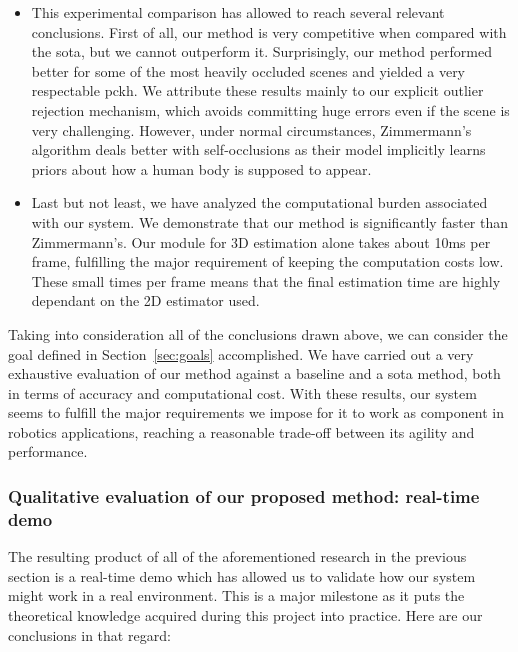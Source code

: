 \begin{itemize}
    \item This experimental comparison has allowed to reach several relevant conclusions. First of all, our method is very competitive when compared with the \gls{sota}, but we cannot outperform it. Surprisingly, our method performed better for some of the most heavily occluded scenes and yielded a very respectable \gls{pckh}. We attribute these results mainly to our explicit outlier rejection mechanism, which avoids committing huge errors even if the scene is very challenging. However, under normal circumstances, Zimmermann's algorithm deals better with self-occlusions as their model implicitly learns priors about how a human body is supposed to appear.
    \item Last but not least, we have analyzed the computational burden associated with our system. We demonstrate that our method is significantly faster than Zimmermann's. Our module for 3D estimation alone takes about 10ms per frame, fulfilling the major requirement of keeping the computation costs low. These small times per frame means that the final estimation time are highly dependant on the 2D estimator used. 
\end{itemize}

Taking into consideration all of the conclusions drawn above, we can consider the goal defined in Section~\ref{sec:goals} accomplished. We have carried out a very exhaustive evaluation of our method against a baseline and a \gls{sota} method, both in terms of accuracy and computational cost. With these results, our system seems to fulfill the major requirements we impose for it to work as component in robotics applications, reaching a reasonable trade-off between its agility and performance. 

\subsubsection{Qualitative evaluation of our proposed method: real-time demo}
The resulting product of all of the aforementioned research in the previous section is a real-time demo which has allowed us to validate how our system might work in a real environment. This is a major milestone as it puts the theoretical knowledge acquired during this project into practice. Here are our conclusions in that regard:

